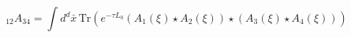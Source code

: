 \begin{equation}
{}_{12}A_{34}=\int d^{d}\bar{x}\,\mathrm{Tr}\left( e^{-\tau L_{0}}\left(
A_{1}(\xi )\star A_{2}(\xi )\right) \star \left( A_{3}(\xi )\star A_{4}(\xi
)\right) \right)   \label{four}
\end{equation}

